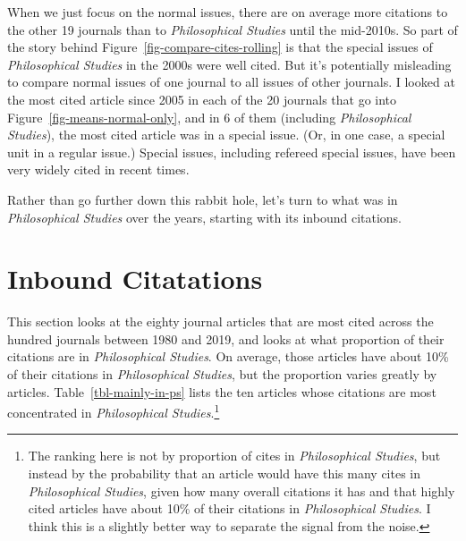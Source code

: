 \documentclass[
  11pt,
  letterpaper,
  DIV=11,
  numbers=noendperiod,
  twoside]{scrartcl}
\begin{document}
When we just focus on the normal issues, there are on average more
citations to the other 19 journals than to \emph{Philosophical Studies}
until the mid-2010s. So part of the story behind
Figure~\ref{fig-compare-cites-rolling} is that the special issues of
\emph{Philosophical Studies} in the 2000s were well cited. But it's
potentially misleading to compare normal issues of one journal to all
issues of other journals. I looked at the most cited article since 2005
in each of the 20 journals that go into
Figure~\ref{fig-means-normal-only}, and in 6 of them (including
\emph{Philosophical Studies}), the most cited article was in a special
issue. (Or, in one case, a special unit in a regular issue.) Special
issues, including refereed special issues, have been very widely cited
in recent times.

Rather than go further down this rabbit hole, let's turn to what was in
\emph{Philosophical Studies} over the years, starting with its inbound
citations.

\section{Inbound Citatations}\label{sec-inbound-citations}

This section looks at the eighty journal articles that are most cited
across the hundred journals between 1980 and 2019, and looks at what
proportion of their citations are in \emph{Philosophical Studies}. On
average, those articles have about 10\% of their citations in
\emph{Philosophical Studies}, but the proportion varies greatly by
articles. Table~\ref{tbl-mainly-in-ps} lists the ten articles whose
citations are most concentrated in \emph{Philosophical
Studies}.\footnote{The ranking here is not by proportion of cites in
  \emph{Philosophical Studies}, but instead by the probability that an
  article would have this many cites in \emph{Philosophical Studies},
  given how many overall citations it has and that highly cited articles
  have about 10\% of their citations in \emph{Philosophical Studies}. I
  think this is a slightly better way to separate the signal from the
  noise.}
\end{document}
